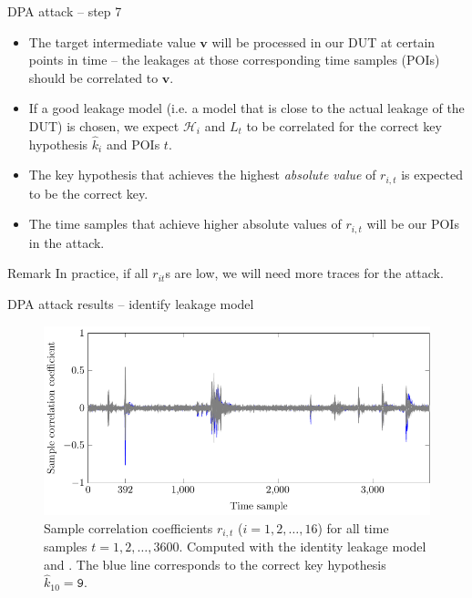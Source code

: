\begin{frame}{DPA attack -- step 7}
    \begin{itemize}
        \item The target intermediate value $\boldsymbol{v}$ will be processed in our DUT at certain points in time -- the leakages at those corresponding time samples (POIs) should be correlated to $\boldsymbol{v}$.
        \item If a good leakage model (i.e. a model that is close to the actual leakage of the DUT) is chosen, we expect $\mathcal{H}_i$ and $L_t$ to be correlated for the correct key hypothesis $\hat{k}_i$ and POIs $t$.
      \item The key hypothesis that achieves the highest \textit{absolute value} of $r_{i,t}$ is expected to be the correct key.
      \item The time samples that achieve higher absolute values of $r_{i,t}$ will be our POIs in the attack.
    \end{itemize}
    \begin{alertblock}{Remark}
        In practice, if all $r_{it}$s are low, we will need more traces for the attack.
    \end{alertblock}
\end{frame}

\begin{frame}{DPA attack results -- identify leakage model}
    \begin{figure}[h]
    \centering
    \includegraphics{fig/correlation_coefficients.pdf}
    \caption{Sample correlation coefficients $r_{i,t}$ ($i=1,2,\dots,16$) for all time samples $t=1,2,\dots,3600$.
    Computed with the identity leakage model and \dataranone.
    The blue line corresponds to the correct key hypothesis $\hat{k}_{10}=\texttt{9}$.}
\end{figure}
\end{frame}

